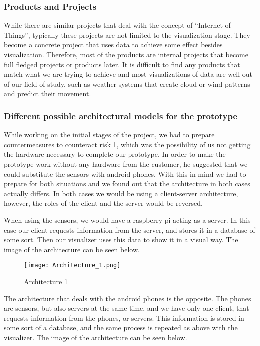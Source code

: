 \documentclass[../document.tex]{subfiles}
\begin{document}
\subsubsection*{Products and Projects}
While there are similar projects that deal with the concept of ``Internet of Things'', typically these projects are not limited to the visualization stage. They become a concrete project that uses data to achieve some effect besides visualization. Therefore, most of the products are internal projects that become full fledged projects or products later. It is difficult to find any products that match what we are trying to achieve and most visualizations of data are well out of our field of study, such as weather systems that create cloud or wind patterns and predict their movement.

\subsubsection*{Different possible architectural models for the prototype}
While working on the initial stages of the project, we had to prepare countermeasures to counteract risk 1, which was the possibility of us not getting the hardware necessary to complete our prototype. In order to make the prototype work without any hardware from the customer, he suggested that we could substitute the sensors with android phones. With this in mind we had to prepare for both situations and we found out that the architecture in both cases actually differs. In both cases we would be using a client-server architecture, however, the roles of the client and the server would be reversed.

When using the sensors, we would have a raspberry pi acting as a server. In this case our client requests information from the server, and stores it in a database of some sort. Then our visualizer uses this data to show it in a visual way. The image of the architecture can be seen below.

\begin{figure}[H]
	\centering
		\texttt{[image: Architecture\_1.png]}
	\caption{Architecture 1}
\end{figure}

The architecture that deals with the android phones is the opposite. The phones are sensors, but also servers at the same time, and we have only one client, that requests information from the phones, or servers. This information is stored in some sort of a database, and the same process is repeated as above with the visualizer. The image of the architecture can be seen below.
\end{document}
